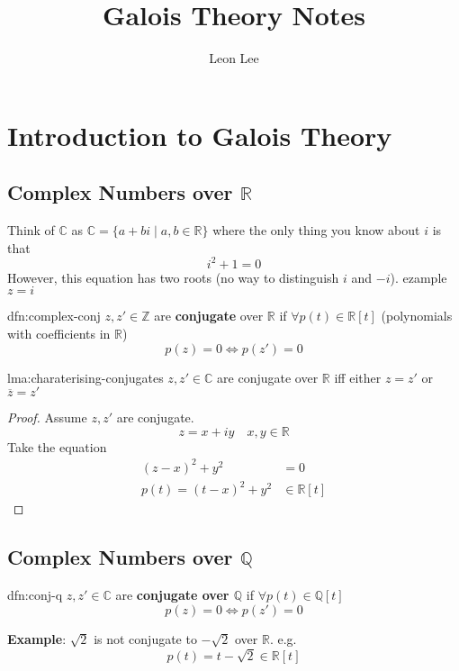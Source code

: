 \documentclass{article}
\title{Galois Theory Notes}
\author{Leon Lee}
\begin{document}
\maketitle
\newpage
\tableofcontents
\newpage

\section{Introduction to Galois Theory}
\subsection{Complex Numbers over \texorpdfstring{$\mathbb{R}$}{R}}

Think of $\mathbb{C}$ as $\mathbb{C} = \{a + bi \mid a,b\in \mathbb{R}\}$ where the only thing you know about $i$ is that
\[i^{2} + 1 = 0\]
However, this equation has two roots (no way to distinguish $i$ and $-i$). ezample $z = i$

\begin{dfn}[Conjugate]{dfn:complex-conj}{}
    $z,z'\in \mathbb{Z}$ are \textbf{conjugate} over $\mathbb{R}$ if $\forall p(t) \in \mathbb{R}[t]$ (polynomials with coefficients in $\mathbb{R}$)
    \[p(z) = 0 \iff p(z') = 0\]
\end{dfn}

\begin{lma}{lma:charaterising-conjugates}{}
    $z,z'\in \mathbb{C}$ are conjugate over $\mathbb{R}$ iff either $z = z'$ or $\overline{z} = z'$
\end{lma}

\begin{proof}
    Assume $z,z'$ are conjugate.
    \[z = x + iy \quad x,y\in \mathbb{R}\]
    Take the equation
    \begin{align*}(z - x) ^{2} + y^{2} &= 0 \\ p(t) = (t - x) ^{2} + y^{2} &\in \mathbb{R}[t]\end{align*}
\end{proof}

\subsection{Complex Numbers over \texorpdfstring{$\mathbb{Q}$}{Q}}
\begin{dfn}{dfn:conj-q}{}
    $z,z'\in \mathbb{C}$ are \textbf{conjugate over $\mathbb{Q}$} if $\forall p(t) \in \mathbb{Q}[t]$
    \[p(z) = 0 \iff p(z') = 0\]
\end{dfn}
\textbf{Example}: $\sqrt{2}$ is not conjugate to $-\sqrt{2}$ over $\mathbb{R}$. e.g.
\[p(t) = t - \sqrt{2}\in \mathbb{R}[t]\]
\end{document}
